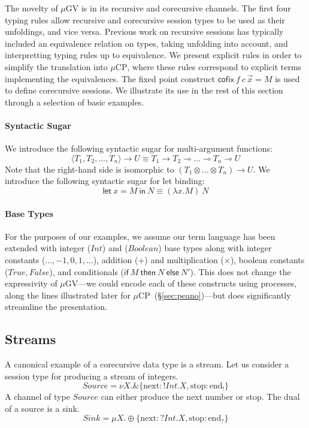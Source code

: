 \documentclass[orivec,envcountsame]{llncs}
\newcommand{\with}{\mathbin\binampersand}
\newcommand{\lto}{\ensuremath{\multimap}}
\newcommand{\uto}{\ensuremath{\rightarrow}}
\newcommand{\outterm}{\mathrm{end}_!}
\newcommand{\interm}{\mathrm{end}_?}
\newcommand{\mkwd}[1]{\mathsf{#1}}
\newcommand{\clabel}[1]{\mathrm{#1}}
\newcommand{\lrkwd}{\mkwd{cofix}}
\newcommand{\gvfix}[3]{\lrkwd\:#1\:#2 = #3}
\newcommand{\gvifthen}[3]{\mkwd{if}\:#1\:\mkwd{then}\:#2\:\mkwd{else}\:#3}
\newcommand{\key}{\mkwd}
\newcommand{\mucp}{$\mu\mathrm{CP}$\xspace}
\newcommand{\mugv}{$\mu\mathrm{GV}$\xspace}
\newcommand{\secref}[1]{(\S\ref{sec:#1})}
\begin{document}
The novelty of \mugv is in its recursive and corecursive channels. The first four typing rules allow
recursive and corecursive session types to be used as their unfoldings, and vice versa. Previous
work on recursive sessions has typically included an equivalence relation on types, taking unfolding
into account, and interpretting typing rules up to equivalence. We present explicit rules in order
to simplify the translation into \mucp, where these rules correspond to explicit terms implementing
the equivalences.
%
The fixed point construct $\gvfix{f}{c\,\vec{x}}{M}$ is used to define corecursive sessions. We
illustrate its use in the rest of this section through a selection of basic examples.

\paragraph{Syntactic Sugar}

We introduce the following syntactic sugar for multi-argument functions:
\[
  \langle T_1, T_2, \dots, T_n \rangle \uto U \equiv T_1 \uto T_2 \lto \dots \lto T_n \lto U
\]
Note that the right-hand side is isomorphic to $(T_1 \otimes \dots \otimes T_n) \uto U$.
%
We introduce the following syntactic sugar for let binding:
\[
\key{let}\:x=M\:\key{in}\:N \equiv (\lambda x.M)\:N
\]

\paragraph{Base Types}

For the purposes of our examples, we assume our term language has been extended with integer ($Int$)
and ($Boolean$) base types along with integer constants ($\dots,-1,0,1,\dots$), addition ($+$)
and multiplication ($\times$), boolean constants ($True, False$), and conditionals
($\gvifthen{M}{N}{N'}$).
%
This does not change the expressivity of \mugv---we could encode each of these constructs using
processes, along the lines illustrated later for \mucp~\secref{peano}---but does significantly
streamline the presentation.

\subsection{Streams}

A canonical example of a corecursive data type is a stream. Let us consider a session type for
producing a stream of integers.
%
\[
Source = \nu X.\with \{\clabel{next}: !Int.X, \clabel{stop}: \outterm \}
\]
%
A channel of type $Source$ can either produce the next number or stop. The dual of a source is a
sink.
\[
Sink = \mu X.\oplus \{\clabel{next}: ?Int.X, \clabel{stop}: \interm \}
\]
\end{document}
